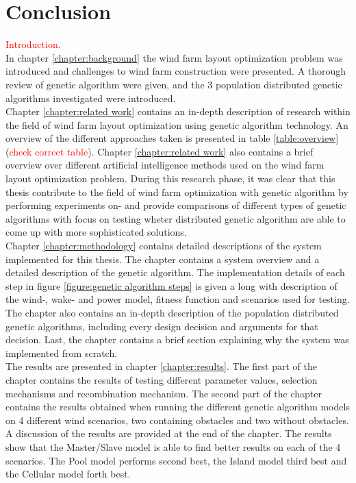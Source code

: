 \chapter{Conclusion}\label{chapter:conclusion}
\textcolor{red}{Introduction.}\\


\noindent In chapter \ref{chapter:background} the wind farm layout optimization problem was introduced and challenges to wind farm construction were presented. A thorough review of genetic algorithm were given, and the 3 population distributed genetic algorithms investigated were introduced.\\


\noindent Chapter \ref{chapter:related work} contains an in-depth description of research within the field of wind farm layout optimization using genetic algorithm technology. An overview of the different approaches taken is presented in table \ref{table:overview} (\textcolor{red}{check correct table}). Chapter \ref{chapter:related work} also contains a brief overview over different artificial intelligence methods used on the wind farm layout optimization problem. During this research phase, it was clear that this thesis contribute to the field of wind farm optimization with genetic algorithm by performing experiments on- and provide comparisons of different types of genetic algorithms with focus on testing wheter distributed genetic algorithm are able to come up with more sophisticated solutions.\\


\noindent Chapter \ref{chapter:methodology} contains detailed descriptions of the system implemented for this thesis. The chapter contains a system overview and a detailed description of the genetic algorithm. The implementation details of each step in figure \ref{figure:genetic algorithm steps} is given a long with description of the wind-, wake- and power model, fitness function and scenarios used for testing. The chapter also contains an in-depth description of the population distributed genetic algorithms, including every design decision and arguments for that decision. Last, the chapter contains a brief section explaining why the system was implemented from scratch. \\


\noindent The results are presented in chapter \ref{chapter:results}. The first part of the chapter contains the results of testing different parameter values, selection mechanisms and recombination mechanism. The second part of the chapter contains the results obtained when running the different genetic algorithm models on 4 different wind scenarios, two containing obstacles and two without obstacles. A discussion of the results are provided at the end of the chapter. The results show that the Master/Slave model is able to find better results on each of the 4 scenarios. The Pool model performs second best, the Island model third best and the Cellular model forth best.\\


